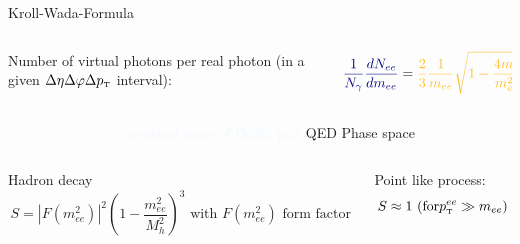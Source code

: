 \documentclass[aspectratio=169,10pt]{beamer}
\newcommand{\pT}          {\ensuremath{p_{\mbox{\tiny T}}}}
\begin{document}
  \begin{frame}{Kroll-Wada-Formula}
    \begin{columns}
      \begin{column}{5cm}
       Number of virtual photons per real photon (in a given $\Delta \eta \Delta \varphi \Delta \pT$ interval):
      \end{column}
      \begin{column}{10cm}
       \begin{equation*}
        \textcolor{AliceBlue}{\frac{1}{N_\gamma} \frac{dN_{ee}}{d m_{ee}}} = \textcolor{AliceYellow}{\frac{2}{3} \frac{1}{m_{ee}} \sqrt{1 - \frac{4 m_e^2}{m_{ee}^2}}} \textcolor{AliceGreen}{(1+ \frac{2 m_e^e}{m_{ee}^2})} \textcolor{AliceRed2}{S}
       \end{equation*}
      \end{column}
    \end{columns}
    \begin{columns}
      \begin{column}{5cm}
      \end{column}
      \begin{column}{10cm}
        \textcolor{AliceBlue}{invariant mass of Dalitz pair} \hspace{0.2cm}  \textcolor{AliceYellow}{QED}  \hspace{0.9cm} \textcolor{AliceGreen}{Phase space} 
      \end{column}
    \end{columns}
    \vspace{0.2cm}
    \begin{columns}
      \begin{column}{9cm}
        Hadron decay \vspace{-0.3cm}
        \begin{equation*}
          S = |F(m_{ee}^2)|^2 (1-\frac{m_{ee}^2}{M_h^2})^3 \text{ with } F(m_{ee}^2) \text{ form factor}
        \end{equation*}
      \end{column}
      \begin{column}{5cm} 
        Point like process: \vspace{-0.3cm}
        \begin{equation*}
         S \approx 1 \text{ (for} \pT^{ee} \gg m_{ee}  )
        \end{equation*}        
      \end{column}
    \end{columns}
    \begin{columns}

\end{columns}
\end{frame}
\end{document}
